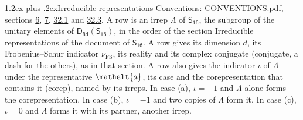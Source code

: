 \documentclass[10pt,a4paper]{article}
\makeatletter
\renewcommand\section{\@startsection{section}{1}{\z@}{-3ex plus -1ex minus -.2ex}%
  {1.2ex plus .2ex}{\normalfont\large\sffamily\bfseries\color{parttitle}}}
\numberwithin{equation}{section}
\newcommand{\eltfont}[1]{{\let\sigma\eltsigma\mathelt{#1}}}
\newcommand{\grp}[1]{\mathsf{#1}}
\newcommand{\elt}[1]{\eltfont{#1}}
\newcommand{\fsind}{\nu_{\mathrm{FS}}}
\makeatother
\begin{document}
\section{Irreducible representations}\label{s:irreps}
Conventions: \href{../../CONVENTIONS.pdf}{CONVENTIONS.pdf}, sections \href{../../../rotation/CONVENTIONS.pdf\#conv.6}{6}, \href{../../../rotation/CONVENTIONS.pdf\#conv.7}{7}, \href{../../CONVENTIONS.pdf\#conv.32.1}{32.1} and \href{../../CONVENTIONS.pdf\#conv.32.3}{32.3}.
\leavevmode\label{n:irrep.Delta}A row is an irrep $\Lambda$ of $\grp{S_{16}}$, the subgroup of the unitary elements of $\grp{D_{8d}}(\grp{S_{16}})$, in the order of the section Irreducible representations of the document of \href{../../../rotation/data/pdf/S16.pdf}{$\grp{S_{16}}$}. \label{n:index.dimension}\label{n:index.frobenius}\label{n:head.irrep}\label{n:head.reality}\label{n:head.conjugate}A row gives its dimension $d$, its Frobenius--Schur indicator $\fsind$, its reality and its complex conjugate (conjugate, a dash for the others), as in that section. \label{n:head.case.corep}\label{n:head.corep}A row also gives the indicator $\iota$ of $\Lambda$ under the representative $\elt{a}$, its case and the corepresentation that contains it (corep), named by its irreps. In case (a), $\iota = +1$ and $\Lambda$ alone forms the corepresentation. In case (b), $\iota = -1$ and two copies of $\Lambda$ form it. In case (c), $\iota = 0$ and $\Lambda$ forms it with its partner, another irrep.
\setlength{\emergencystretch}{2em}\par\setlength{\emergencystretch}{0pt}
\end{document}
